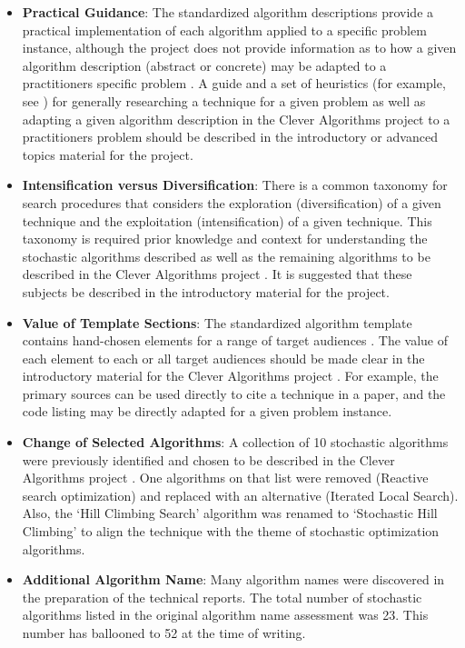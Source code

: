 \documentclass[a4paper, 11pt]{article}
\begin{document}
\begin{itemize}
	\item \textbf{Practical Guidance}: The standardized algorithm descriptions provide a practical implementation of each algorithm applied to a specific problem instance, although the project does not provide information as to how a given algorithm description (abstract or concrete) may be adapted to a practitioners specific problem \cite{Brownlee2010i}. A guide and a set of heuristics (for example, see \cite{Gendreau2003}) for generally researching a technique for a given problem as well as adapting a given algorithm description in the Clever Algorithms project to a practitioners problem should be described in the introductory or advanced topics material for the project.
	\item \textbf{Intensification versus Diversification}: There is a common taxonomy for search procedures that considers the exploration (diversification) of a given technique and the exploitation (intensification) of a given technique. This taxonomy is required prior knowledge and context for understanding the stochastic algorithms described as well as the remaining algorithms to be described in the Clever Algorithms project \cite{Brownlee2010k}. It is suggested that these subjects be described in the introductory material for the project.
	\item \textbf{Value of Template Sections}: The standardized algorithm template contains hand-chosen elements for a range of target audiences \cite{Brownlee2010a}. The value of each element to each or all target audiences should be made clear in the introductory material for the Clever Algorithms project \cite{Brownlee2010k}. For example, the primary sources can be used directly to cite a technique in a paper, and the code listing may be directly adapted for a given problem instance.
	\item \textbf{Change of Selected Algorithms}: A collection of 10 stochastic algorithms were previously identified and chosen to be described in the Clever Algorithms project \cite{Brownlee2010b}. One algorithms on that list were removed (Reactive search optimization) and replaced with an alternative (Iterated Local Search). Also, the `Hill Climbing Search' algorithm was renamed to `Stochastic Hill Climbing' to align the technique with the theme of stochastic optimization algorithms.
	\item \textbf{Additional Algorithm Name}: Many algorithm names were discovered in the preparation of the technical reports. The total number of stochastic algorithms listed in the original algorithm name assessment was 23. This number has ballooned to 52 at the time of writing.
\end{itemize}
\end{document}
